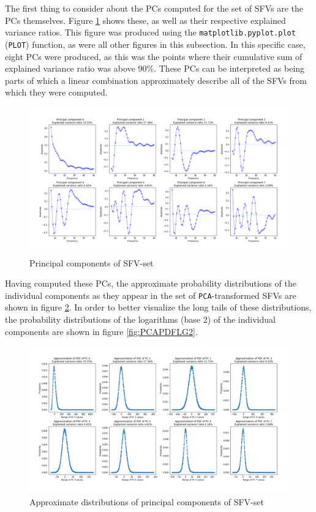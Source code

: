 \documentclass{article}
\begin{document}
The first thing to consider about the PCs computed for the set of SFVs are the PCs themselves.
Figure \ref{fig:PCS} shows these, as well as their respective explained variance ratios. 
This figure was produced using the \texttt{matplotlib.pyplot.plot} (\texttt{PLOT}) function, as were all other figures in this subsection.
In this specific case, eight PCs were produced, as this was the points where their cumulative sum of explained variance ratio was above 90\%.
These PCs can be interpreted as being parts of which a linear combination approximately describe all of the SFVs from which they were computed.

\begin{figure}[H]
    \centering
    \centerline{\includegraphics[width=1\textwidth]{images/PCA/PCS.png}}
    \caption{Principal components of SFV-set}
    \label{fig:PCS}
\end{figure}

Having computed these PCs, the approximate probability distributions of the individual components as they appear in the set of \texttt{PCA}-transformed SFVs are shown in figure \ref{fig:PCAPDF}. 
In order to better visualize the long tails of these distributions, the probability distributions of the logarithms (base 2) of the individual components are shown in figure \ref{fig:PCAPDFLG2}.

\begin{figure}[H]
    \centering
    \centerline{\includegraphics[width=1\textwidth]{images/PCA/PCAPDF.png}}
    \caption{Approximate distributions of principal components of SFV-set}
    \label{fig:PCAPDF}
\end{figure}
\end{document}
